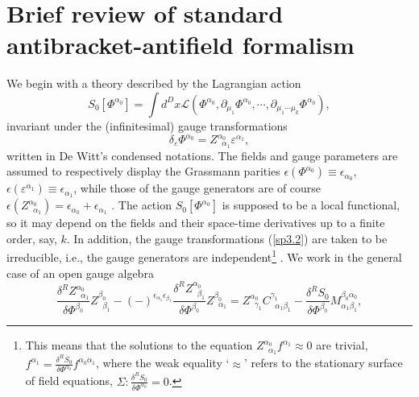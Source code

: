 \documentclass[a4paper,12pt]{article}
\begin{document}
\section{Brief review of standard antibracket-antifield formalism}

We begin with a theory described by the Lagrangian action 
\begin{equation}
S_{0}\left[ \Phi ^{\alpha _{0}}\right] =\int d^{D}x\mathcal{L}\left( \Phi
^{\alpha _{0}},\partial _{\mu _{1}}\Phi ^{\alpha _{0}},\cdots ,\partial
_{\mu _{1}\cdots \mu _{k}}\Phi ^{\alpha _{0}}\right) ,  \label{sp3.1}
\end{equation}
invariant under the (infinitesimal) gauge transformations 
\begin{equation}
\delta _{\varepsilon }\Phi ^{\alpha _{0}}=Z_{\;\;\alpha _{1}}^{\alpha
_{0}}\varepsilon ^{\alpha _{1}},  \label{sp3.2}
\end{equation}
written in De Witt's condensed notations. The fields and gauge parameters
are assumed to respectively display the Grassmann parities $\epsilon \left(
\Phi ^{\alpha _{0}}\right) \equiv \epsilon _{\alpha _{0}}$, $\epsilon \left(
\varepsilon ^{\alpha _{1}}\right) \equiv \epsilon _{\alpha _{1}}$, while
those of the gauge generators are of course $\epsilon \left( Z_{\;\;\alpha
_{1}}^{\alpha _{0}}\right) =\epsilon _{\alpha _{0}}+\epsilon _{\alpha _{1}}$%
. The action $S_{0}\left[ \Phi ^{\alpha _{0}}\right] $ is supposed to be a
local functional, so it may depend on the fields and their space-time
derivatives up to a finite order, say, $k$. In addition, the gauge
transformations (\ref{sp3.2}) are taken to be irreducible, i.e., the gauge
generators are independent\footnote{%
This means that the solutions to the equation $Z_{\;\;\alpha _{1}}^{\alpha
_{0}}f^{\alpha _{1}}\approx 0$ are trivial, $f^{\alpha _{1}}=\frac{\delta
^{R}S_{0}}{\delta \Phi ^{\alpha _{0}}}f^{\alpha _{0}\alpha _{1}}$, where the
weak equality `$\approx $' refers to the stationary surface of field
equations, $\Sigma :\frac{\delta ^{R}S_{0}}{\delta \Phi ^{\alpha _{0}}}=0$.}%
. We work in the general case of an open gauge algebra 
\begin{equation}
\frac{\delta ^{R}Z_{\;\;\alpha _{1}}^{\alpha _{0}}}{\delta \Phi ^{\beta _{0}}%
}Z_{\;\;\beta _{1}}^{\beta _{0}}-\left( -\right) ^{\epsilon _{\alpha
_{1}}\epsilon _{\beta _{1}}}\frac{\delta ^{R}Z_{\;\;\beta _{1}}^{\alpha _{0}}%
}{\delta \Phi ^{\beta _{0}}}Z_{\;\;\alpha _{1}}^{\beta _{0}}=Z_{\;\;\gamma
_{1}}^{\alpha _{0}}C_{\;\;\alpha _{1}\beta _{1}}^{\gamma _{1}}-\frac{\delta
^{R}S_{0}}{\delta \Phi ^{\beta _{0}}}M_{\alpha _{1}\beta _{1}}^{\beta
_{0}\alpha _{0}},  \label{sp3.a}
\end{equation}
\end{document}
